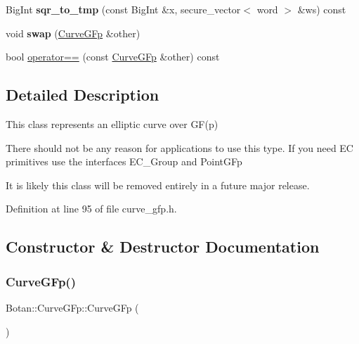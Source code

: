 \begin{DoxyCompactItemize}
\item 
\mbox{\label{class_botan_1_1_curve_g_fp_ac98411eb77d69b2e2aa7da14f5522ba5}} 
Big\+Int {\bfseries sqr\+\_\+to\+\_\+tmp} (const Big\+Int \&x, secure\+\_\+vector$<$ word $>$ \&ws) const
\item 
\mbox{\label{class_botan_1_1_curve_g_fp_a58953b2563d8c6a59cd146820a83b13e}} 
void {\bfseries swap} (\mbox{\hyperlink{class_botan_1_1_curve_g_fp}{Curve\+G\+Fp}} \&other)
\item 
bool \mbox{\hyperlink{class_botan_1_1_curve_g_fp_adf896804903ce76835069b5d51aeb161}{operator==}} (const \mbox{\hyperlink{class_botan_1_1_curve_g_fp}{Curve\+G\+Fp}} \&other) const
\end{DoxyCompactItemize}


\subsection{Detailed Description}
This class represents an elliptic curve over G\+F(p)

There should not be any reason for applications to use this type. If you need EC primitives use the interfaces E\+C\+\_\+\+Group and Point\+G\+Fp

It is likely this class will be removed entirely in a future major release. 

Definition at line 95 of file curve\+\_\+gfp.\+h.



\subsection{Constructor \& Destructor Documentation}
\mbox{\label{class_botan_1_1_curve_g_fp_aa040fce271ca5bcff4b19717aae958a2}} 
\subsubsection{\texorpdfstring{Curve\+G\+Fp()}{CurveGFp()}\hspace{0.1cm}{\footnotesize\ttfamily [1/2]}}
{\footnotesize\ttfamily Botan\+::\+Curve\+G\+Fp\+::\+Curve\+G\+Fp (\begin{DoxyParamCaption}{ }\end{DoxyParamCaption})\hspace{0.3cm}{\ttfamily [default]}}

